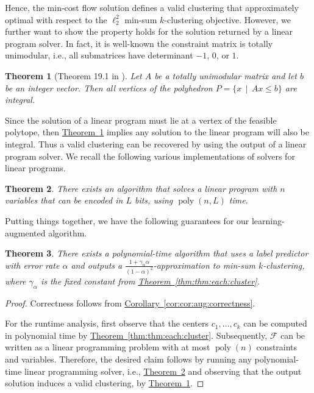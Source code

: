 \documentclass[10pt,a4paper]{amsart}
\newtheorem{theorem}{Theorem}[section]
\newcommand{\namedref}[2]{\hyperref[#2]{#1~\ref*{#2}}}
\newcommand{\thmlab}[1]{\label{thm:#1}}
\newcommand{\thmref}[1]{\namedref{Theorem}{thm:#1}}
\newcommand{\corref}[1]{\namedref{Corollary}{cor:#1}}
\def \calF    {\mdef{\mathcal{F}}}
\newcommand{\mdef}[1]{{\ensuremath{#1}}\xspace}  %
\DeclareMathOperator*{\poly}{poly}
\begin{document}
Hence, the min-cost flow solution defines a valid clustering that approximately optimal with respect to the $\ell_2^2$ min-sum $k$-clustering objective. 
However, we further want to show the property holds for the solution returned by a linear program solver. 
In fact, it is well-known the constraint matrix is totally unimodular, i.e., all submatrices have determinant $-1$, $0$, or $1$. 
\begin{theorem}
[Theorem 19.1 in \cite{schrijver1998theory}]
\thmlab{thm:unimodular:corner}
Let $A$ be a totally unimodular matrix and let $b$ be an integer vector. 
Then all vertices of the polyhedron $P=\{x\,\mid\,Ax\le b\}$ are integral. 
\end{theorem}
Since the solution of a linear program must lie at a vertex of the feasible polytope, then \thmref{thm:unimodular:corner} implies any solution to the linear program will also be integral. 
Thus a valid clustering can be recovered by using the output of a linear program solver. 
We recall the following various implementations of solvers for linear programs.
\begin{theorem}
\thmlab{thm:lp:solver}
\cite{Karmarkar84,Vaidya89a,Vaidya90,LeeS15,LeeSZ19,CohenLS21,JiangSWZ21}
There exists an algorithm that solves a linear program with $n$ variables that can be encoded in $L$ bits, using $\poly(n,L)$ time.
\end{theorem}
Putting things together, we have the following guarantees for our learning-augmented algorithm.
\begin{theorem}
There exists a polynomial-time algorithm that uses a label predictor with error rate $\alpha$ and outputs a $\frac{1+\gamma_\alpha\alpha}{(1-\alpha)^2}$-approximation to min-sum $k$-clustering, where $\gamma_\alpha$ is the fixed constant from \thmref{thm:each:cluster}. 
\end{theorem}
\begin{proof}
Correctness follows from \corref{cor:aug:correctness}. 

For the runtime analysis, first observe that the centers $c_1,\ldots,c_k$ can be computed in polynomial time by \thmref{thm:each:cluster}. 
Subsequently, $\calF$ can be written as a linear programming problem with at most $\poly(n)$ constraints and variables. 
Therefore, the desired claim follows by running any polynomial-time linear programming solver, i.e., \thmref{thm:lp:solver} and observing that the output solution induces a valid clustering, by \thmref{thm:unimodular:corner}. 
\end{proof}
\end{document}
